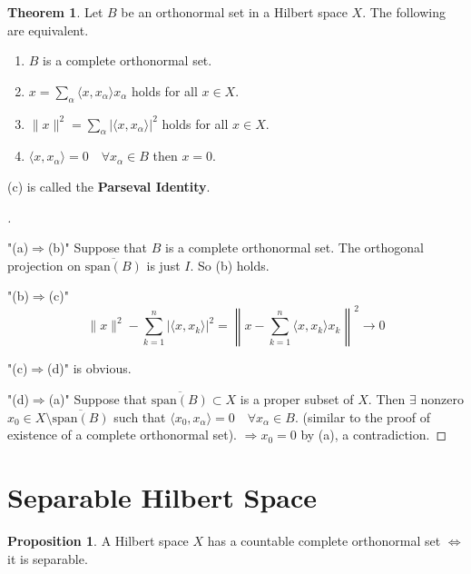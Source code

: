 \documentclass{article}
\theoremstyle{definition}
\newtheorem{thm}{Theorem}
\newtheorem{prop}{Proposition}
\newenvironment{proofs}[1][\proofname]{%
  \begin{proof}[#1]$ $\par\nobreak\ignorespaces
}{%
  \end{proof}
}
\begin{document}
\begin{thm}
	Let $B$ be an orthonormal set in a Hilbert space $X$.
	The following are equivalent.
	\begin{enumerate}
		\item[(a)] $B$ is a complete orthonormal set.

		\item[(b)] $x = \sum_\alpha \langle x, x_\alpha \rangle x_\alpha$ holds for all $x \in X$.

		\item[(c)] $\|x\|^2 = \sum_\alpha |\langle x, x_\alpha \rangle|^2$ holds for all $x \in X$.

		\item[(d)] $\langle x, x_\alpha \rangle = 0 \quad \forall x_\alpha \in B$ then $x = 0$.
	\end{enumerate}
	(c) is called the \textbf{Parseval Identity}.
\end{thm}

\begin{proofs}
	\par "(a)$\Rightarrow$(b)" Suppose that $B$ is a complete orthonormal set.
	The orthogonal projection on $\overline{\text{span}(B)}$ is just $I$.
	So (b) holds.

	\par "(b)$\Rightarrow$(c)" 
	\[
		\|x\|^2 - \sum_{k = 1}^n |\langle x, x_k \rangle |^2 = \left\|x - \sum_{k = 1}^n \langle x, x_k \rangle x_k \right\|^2 \to 0
	\]

	\par "(c)$\Rightarrow$(d)" is obvious.

	\par "(d)$\Rightarrow$(a)" Suppose that $\overline{\text{span}(B)} \subset X$ is a proper subset of $X$.
	Then $\exists$ nonzero $x_0 \in X \setminus \overline{\text{span}(B)}$ such that $\langle x_0, x_\alpha \rangle = 0 \quad \forall x_\alpha \in B$.
	(similar to the proof of existence of a complete orthonormal set).
	$\Rightarrow x_0 = 0$ by (a), a contradiction.
\end{proofs}

\section{Separable Hilbert Space}

\begin{prop}
	A Hilbert space $X$ has a countable complete orthonormal set $\Leftrightarrow$ it is separable.
\end{prop}
\end{document}
